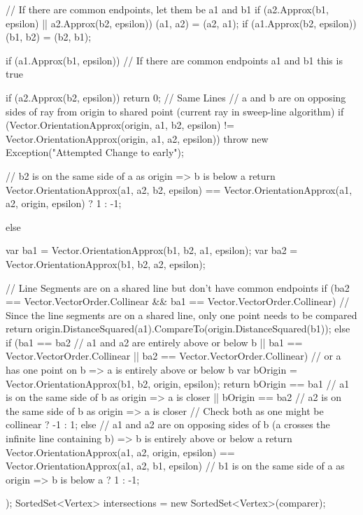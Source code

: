 \documentclass[12pt]{article}
\begin{document}
\begin{Csharp}[caption=class Map]
\begin{Csharp}
{{        // If there are common endpoints, let them be a1 and b1
        if (a2.Approx(b1, epsilon) || a2.Approx(b2, epsilon)) (a1, a2) = (a2, a1);
        if (a1.Approx(b2, epsilon)) (b1, b2) = (b2, b1);

        if (a1.Approx(b1, epsilon)) // If there are common endpoints a1 and b1 this is true
        {
            if (a2.Approx(b2, epsilon)) return 0; // Same Lines
            // a and b are on opposing sides of ray from origin to shared point (current ray in sweep-line algorithm)
            if (Vector.OrientationApprox(origin, a1, b2, epsilon) != Vector.OrientationApprox(origin, a1, a2, epsilon)) 
            {
                throw new Exception("Attempted Change to early");
            }

            // b2 is on the same side of a as origin => b is below a
            return Vector.OrientationApprox(a1, a2, b2, epsilon) == Vector.OrientationApprox(a1, a2, origin, epsilon) ? 1 : -1; 
        }
        else
        {
            var ba1 = Vector.OrientationApprox(b1, b2, a1, epsilon);
            var ba2 = Vector.OrientationApprox(b1, b2, a2, epsilon);

            // Line Segments are on a shared line but don't have common endpoints 
            if (ba2 == Vector.VectorOrder.Collinear && ba1 == Vector.VectorOrder.Collinear)
            { 
                // Since the line segments are on a shared line, only one point needs to be compared
                return origin.DistanceSquared(a1).CompareTo(origin.DistanceSquared(b1));
            }
            else if (ba1 == ba2 // a1 and a2 are entirely above or below b
                    || ba1 == Vector.VectorOrder.Collinear || ba2 == Vector.VectorOrder.Collinear) // or a has one point on b => a is entirely above or below b
            { 
                var bOrigin = Vector.OrientationApprox(b1, b2, origin, epsilon);
                return bOrigin == ba1 // a1 is on the same side of b as origin => a is closer 
                    || bOrigin == ba2 // a2 is on the same side of b as origin => a is closer // Check both as one might be collinear
                    ? -1 : 1;
            }
            else // a1 and a2 are on opposing sides of b (a crosses the infinite line containing b) => b is entirely above or below a
            {
                return Vector.OrientationApprox(a1, a2, origin, epsilon) == Vector.OrientationApprox(a1, a2, b1, epsilon) // b1 is on the same side of a as origin => b is below a
                        ? 1 : -1;
            }
        }
    });
    SortedSet<Vertex> intersections = new SortedSet<Vertex>(comparer);

}
\end{Csharp}
\end{Csharp}
\end{document}
